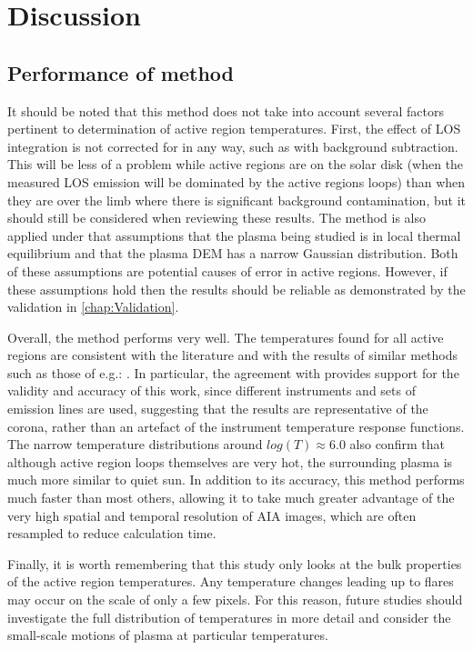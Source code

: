 \documentclass{article}
\begin{document}
\section{Discussion}

\subsection{Performance of method}
It should be noted that this method does not take into account several
factors pertinent to determination of active region temperatures.
First, the effect of LOS integration is not corrected for in any way,
such as with background subtraction. This will be less of a problem
while active regions are on the solar disk (when the measured LOS
emission will be dominated by the active regions loops) than when
they are over the limb where there is significant background contamination,
but it should still be considered when reviewing these results. The
method is also applied under that assumptions that the plasma being
studied is in local thermal equilibrium and that the plasma DEM has
a narrow Gaussian distribution. Both of these assumptions are potential
causes of error in active regions. However, if these assumptions hold
then the results should be reliable as demonstrated by the validation
in \ref{chap:Validation}.

Overall, the method performs very well. The temperatures found for
all active regions are consistent with the literature and with the
results of similar methods such as those of e.g.: \citet{Aschwanden2013,Warren2008,DelZanna2013}.
In particular, the agreement with \citet{Warren2008} provides support
for the validity and accuracy of this work, since different instruments
and sets of emission lines are used, suggesting that the results are
representative of the corona, rather than an artefact of the instrument
temperature response functions. The narrow temperature distributions
around $log(T)\approx6.0$ also confirm that although active region
loops themselves are very hot, the surrounding plasma is much more
similar to quiet sun. In addition to its accuracy, this method performs
much faster than most others, allowing it to take much greater advantage
of the very high spatial and temporal resolution of AIA images, which
are often resampled to reduce calculation time.

Finally, it is worth remembering that this study only looks at the
bulk properties of the active region temperatures. Any temperature
changes leading up to flares may occur on the scale of only a few
pixels. For this reason, future studies should investigate the full
distribution of temperatures in more detail and consider the small-scale
motions of plasma at particular temperatures.
\end{document}
